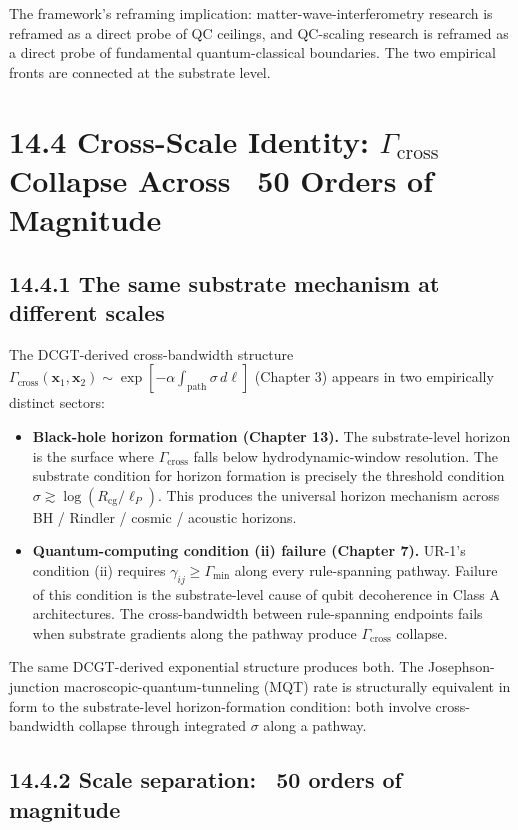 \documentclass[11pt]{book}
\begin{document}
The framework's reframing implication: matter-wave-interferometry research is reframed as a direct probe of QC ceilings, and QC-scaling research is reframed as a direct probe of fundamental quantum-classical boundaries. The two empirical fronts are connected at the substrate level.

\section{14.4 Cross-Scale Identity: $\Gamma_\mathrm{cross}$ Collapse Across ~50 Orders of Magnitude}

\subsection{14.4.1 The same substrate mechanism at different scales}

The DCGT-derived cross-bandwidth structure $\Gamma_\mathrm{cross}(\mathbf{x}_1, \mathbf{x}_2) \sim \exp[-\alpha\int_\mathrm{path}\sigma\,d\ell]$ (Chapter 3) appears in two empirically distinct sectors:

\begin{itemize}
\item \textbf{Black-hole horizon formation (Chapter 13).} The substrate-level horizon is the surface where $\Gamma_\mathrm{cross}$ falls below hydrodynamic-window resolution. The substrate condition for horizon formation is precisely the threshold condition $\sigma \gtrsim \log(R_\mathrm{cg}/\ell_P)$. This produces the universal horizon mechanism across BH / Rindler / cosmic / acoustic horizons.
\item \textbf{Quantum-computing condition (ii) failure (Chapter 7).} UR-1's condition (ii) requires $\gamma_{ij} \geq \Gamma_\mathrm{min}$ along every rule-spanning pathway. Failure of this condition is the substrate-level cause of qubit decoherence in Class A architectures. The cross-bandwidth between rule-spanning endpoints fails when substrate gradients along the pathway produce $\Gamma_\mathrm{cross}$ collapse.
\end{itemize}

The same DCGT-derived exponential structure produces both. The Josephson-junction macroscopic-quantum-tunneling (MQT) rate is structurally equivalent in form to the substrate-level horizon-formation condition: both involve cross-bandwidth collapse through integrated $\sigma$ along a pathway.

\subsection{14.4.2 Scale separation: ~50 orders of magnitude}
\end{document}
